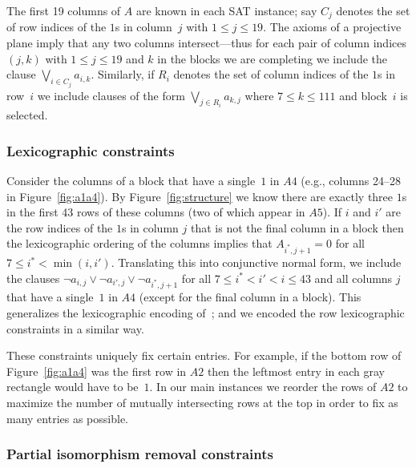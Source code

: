 \documentclass[letterpaper]{article}
\begin{document}
The first 19 columns of $A$ are known in each SAT instance;
say $C_j$ denotes the set of row indices
of the $1$s in column~$j$ with $1\leq j\leq19$.
The axioms of a projective plane imply that any two
columns intersect---thus for each pair of column indices $(j,k)$
with $1\leq j\leq19$ and $k$ in the
blocks we are completing we include the clause $\bigvee_{i\in C_j} a_{i,k}$.
Similarly, if $R_i$ denotes the set of column indices
of the $1$s in row~$i$ we include clauses of the form $\bigvee_{j\in R_i} a_{k,j}$
where $7\leq k\leq111$ and block~$i$ is selected.

\subsubsection{Lexicographic constraints}

Consider the columns of a block that have a single~$1$ in $A4$
(e.g., columns 24--28 in Figure~\ref{fig:a1a4}).
By Figure~\ref{fig:structure} we know there are exactly
three $1$s in the first 43 rows of these columns (two
of which appear in $A5$).  If $i$ and $i'$ are the row
indices of the $1$s in column $j$ that is not
the final column in a block then the lexicographic
ordering of the columns implies that $A_{i^*,j+1}=0$
for all $7\leq i^*<\min(i,i')$.  Translating this into
conjunctive normal form, we include the clauses
$\lnot a_{i,j}\lor\lnot a_{i',j}\lor\lnot a_{i^*,j+1}$
for all $7\leq i^*<i'<i\leq 43$ and all columns $j$ that
have a single~$1$ in $A4$ (except for the final column in a block).
This generalizes the lexicographic encoding of~\cite{bright2020unsatisfiability};
and we encoded the row lexicographic constraints in a similar way.

These constraints uniquely fix certain entries.  For example,
if the bottom row of Figure~\ref{fig:a1a4} was the first row
in $A2$ then the leftmost entry in each gray rectangle would
have to be~$1$.  In our main instances we reorder the rows
of $A2$ to maximize the number of mutually intersecting rows
at the top in order to fix as many entries as possible.

\subsubsection{Partial isomorphism removal constraints}
\end{document}
